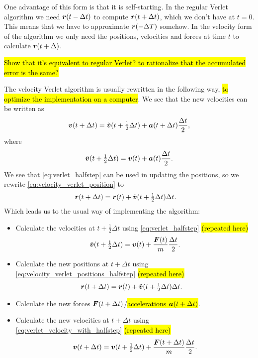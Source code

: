 One advantage of this form is that it is self-starting. In the regular Verlet algorithm we need $\boldsymbol{r}(t-\Delta t)$ to compute $\boldsymbol{r}(t+\Delta t)$, which we don't have at $t = 0$. This means that we have to approximate $\boldsymbol{r}(-\Delta T)$ somehow. In the velocity form of the algorithm we only need the positions, velocities and forces at time $t$ to calculate $\boldsymbol{r}(t+\Delta)$.

\hl{Show that it's equivalent to regular Verlet? to rationalize that the accumulated error is the same?}

The velocity Verlet algorithm is usually rewritten in the following way, \hl{to optimize the implementation on a computer}. We see that the new velocities can be written as
\begin{align}
    \boldsymbol{v}(t+\Delta t) = \tilde{\boldsymbol{v}}(t + \tfrac{1}{2}\Delta t) + \boldsymbol{a}(t+\Delta t)\frac{\Delta t}{2}, \label{eq:verlet_velocity_with_halfstep}
\end{align}
where
\begin{align}
    \tilde{\boldsymbol{v}}(t + \tfrac{1}{2}\Delta t) = \boldsymbol{v}(t) + \boldsymbol{a}(t)\frac{\Delta t}{2}.\label{eq:verlet_halfstep}
\end{align}
We see that \cref{eq:verlet_halfstep} can be used in updating the positions, so we rewrite \cref{eq:velocity_verlet_position} to
\begin{align}
    \boldsymbol{r}(t + \Delta t) &= \boldsymbol{r}(t) + \tilde{\boldsymbol{v}}(t+\tfrac{1}{2}\Delta t)\Delta t.\label{eq:velocity_verlet_positions_halfstep}
\end{align}
Which leads us to the usual way of implementing the algorithm\cite{allen1989computer}:
\begin{itemize}
    \item Calculate the velocities at $t+\tfrac{1}{2}\Delta t$ using \cref{eq:verlet_halfstep} \hl{(repeated here)}
    \begin{align*}
        \tilde{\boldsymbol{v}}(t + \tfrac{1}{2}\Delta t) = \boldsymbol{v}(t) + \frac{\boldsymbol{F}(t)}{m}\frac{\Delta t}{2}.
    \end{align*}
    \item Calculate the new positions at $t + \Delta t$ using \cref{eq:velocity_verlet_positions_halfstep} \hl{(repeated here)}
    \begin{align*}
        \boldsymbol{r}(t + \Delta t) &= \boldsymbol{r}(t) + \tilde{\boldsymbol{v}}(t+\tfrac{1}{2}\Delta t)\Delta t.
    \end{align*}
    \item Calculate the new forces $\boldsymbol{F}(t+\Delta t)$/\hl{accelerations $\boldsymbol{a}(t+\Delta t)$}.
    \item Calculate the new velocities at $t+\Delta t$ using \cref{eq:verlet_velocity_with_halfstep} \hl{(repeated here)}
    \begin{align*}
        \boldsymbol{v}(t+\Delta t) = \boldsymbol{v}(t + \tfrac{1}{2}\Delta t) + \frac{\boldsymbol{F}(t + \Delta t)}{m}\frac{\Delta t}{2}.
    \end{align*}
\end{itemize}
